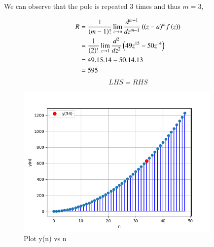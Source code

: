 \documentclass[journal,12pt,onecolumn]{IEEEtran}
\theoremstyle{remark}
\begin{document}
We can observe that the pole is repeated $3$ times and thus $m=3$,

\begin{align}
R&=\frac{1}{\left(m-1\right)!}\lim\limits_{z\to a}\frac{d^{m-1}}{dz^{m-1}}\left({(z-a)}^{m}f\left(z\right)\right) \\
&=\frac{1}{\left(2\right)!}\lim\limits_{z\to 1}\frac{d^{2}}{dz^{2}}\left(49z^{15}-50z^{14}\right)\\
&=49.15.14-50.14.13\\
&=595
\end{align}
\[ LHS = RHS \]




\begin{figure}[h]
    \centering
    \includegraphics[width=100mm]{figs/fig1.png}
    \caption{Plot y(n) vs n}
\end{figure}

 
\end{document}
